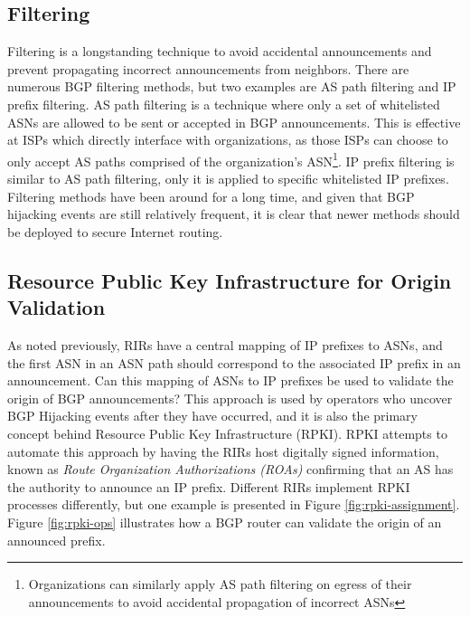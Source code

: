 \documentclass[conference]{IEEEtran}
\begin{document}
\subsection{Filtering}
Filtering is a longstanding technique to avoid accidental announcements and prevent propagating incorrect announcements from neighbors.  There are numerous BGP filtering methods, but two examples are AS path filtering and IP prefix filtering.  AS path filtering is a technique where only a set of whitelisted ASNs are allowed to be sent or accepted in BGP announcements.  This is effective at ISPs which directly interface with organizations, as those ISPs can choose to only accept AS paths comprised of the organization's ASN\footnote{Organizations can similarly apply AS path filtering on egress of their announcements to avoid accidental propagation of incorrect ASNs}.  IP prefix filtering is similar to AS path filtering, only it is applied to specific whitelisted IP prefixes.  Filtering methods have been around for a long time, and given that BGP hijacking events are still relatively frequent, it is clear that newer methods should be deployed to secure Internet routing.

\subsection{Resource Public Key Infrastructure for Origin Validation}
As noted previously, RIRs have a central mapping of IP prefixes to ASNs, and the first ASN in an ASN path should correspond to the associated IP prefix in an announcement.  Can this mapping of ASNs to IP prefixes be used to validate the origin of BGP announcements?  This approach is used by operators who uncover BGP Hijacking events after they have occurred, and it is also the primary concept behind Resource Public Key Infrastructure (RPKI).  RPKI attempts to automate this approach by having the RIRs host digitally signed information, known as \emph{Route Organization Authorizations (ROAs)} confirming that an AS has the authority to announce an IP prefix.  Different RIRs implement RPKI processes differently, but one example is presented in Figure \ref{fig:rpki-assignment}.  Figure \ref{fig:rpki-ops} illustrates how a BGP router can validate the origin of an announced prefix.
\end{document}
